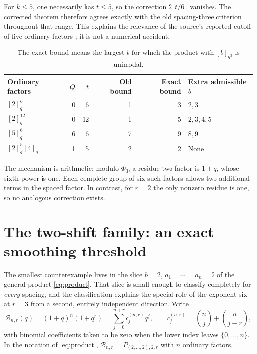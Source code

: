 \documentclass[11pt]{article}
\theoremstyle{research}
\theoremstyle{definition}
\newcommand{\qi}[1]{[#1]_q}
\newcommand{\qir}[2]{[#1]_{q^{#2}}}
\newcommand{\TS}{\mathcal B}
\numberwithin{equation}{section}
\begin{document}
For $k\le5$, one necessarily has $t\le5$, so the correction
$2\lfloor t/6\rfloor$ vanishes. The corrected theorem therefore agrees
exactly with the old spacing-three criterion throughout that range.
This explains the relevance of the source's reported cutoff of five
ordinary factors \cite[p.~14]{CIMSY}; it is not a numerical accident.

\begin{table}[htbp]
\centering
\small
\begin{tabular}{@{}lrrrrl@{}}
\toprule
Ordinary factors & $Q$ & $t$ & Old bound & Exact bound & Extra admissible $b$ \\
\midrule
$\qi2^6$  & 0 & 6  & 1 & 3 & $2,3$ \\
$\qi2^{12}$ & 0 & 12 & 1 & 5 & $2,3,4,5$ \\
$\qi5^6$ & 6 & 6 & 7 & 9 & $8,9$ \\
$\qi2^5\qi4$ & 1 & 5 & 2 & 2 & None \\
\bottomrule
\end{tabular}
\caption{The exact bound means the largest $b$ for which the product with $\qir b3$ is unimodal.}
\label{tab:examples}
\end{table}

The mechanism is arithmetic: modulo $\Phi_3$, a residue-two factor is
$1+q$, whose sixth power is one. Each complete group of six such factors
allows two additional terms in the spaced factor. In contrast, for
$r=2$ the only nonzero residue is one, so no analogous correction exists.

\section{The two-shift family: an exact smoothing threshold}
\label{sec:twoshift}
The smallest counterexample lives in the slice $b=2$, $a_1=\cdots=a_n=2$
of the general product \eqref{eq:product}. That slice is small enough to
classify completely for \emph{every} spacing, and the classification
explains the special role of the exponent six at $r=3$ from a second,
entirely independent direction. Write
\begin{equation}\label{eq:family}
 \TS_{n,r}(q)=(1+q)^n(1+q^r)=\sum_{j=0}^{n+r}c_j^{(n,r)}q^j,
 \qquad
 c_j^{(n,r)}=\binom nj+\binom n{j-r},
\end{equation}
with binomial coefficients taken to be zero when the lower index leaves
$\{0,\ldots,n\}$. In the notation of \eqref{eq:product},
$\TS_{n,r}=P_{(2,\ldots,2),2,r}$ with $n$ ordinary factors.
\end{document}
